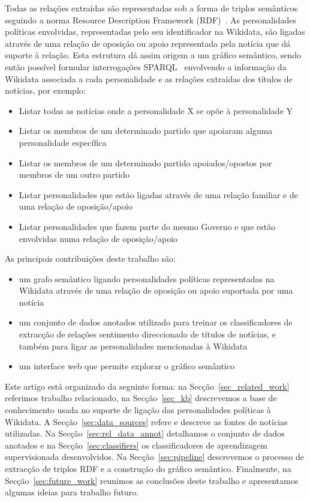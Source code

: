 \documentclass[a4paper, twocolumn, 11pt, twoside]{article}
\begin{document}
Todas as relações extraídas são representadas sob a forma de triplos semânticos seguindo a norma Resource Description Framework (RDF)~\citep{schreiber2014primer}. As personalidades políticas envolvidas, representadas pelo seu identificador na Wikidata, são ligadas através de uma relação de oposição ou apoio representada pela notícia que dá suporte à relação. Esta estrutura dá assim origem a um gráfico semântico, sendo então possível formular interrogações SPARQL~\citep{2013sparql} envolvendo a informação da Wikidata associada a cada personalidade e as relações extraídas dos títulos de notícias, por exemplo:

\begin{itemize}
\item{Listar todas as notícias onde a personalidade X se opõe à personalidade Y}
\item{Listar os membros de um determinado partido que apoiaram alguma personalidade específica}
\item{Listar os membros de um determinado partido apoiados/opostos por membros de um outro partido}
\item{Listar personalidades que estão ligadas através de uma relação familiar e de uma relação de oposição/apoio}
\item{Listar personalidades que fazem parte do mesmo Governo e que estão envolvidas numa relação de oposição/apoio}
\end{itemize}

As principais contribuições deste trabalho são: 

\begin{itemize}
\item{um grafo semântico ligando personalidades políticas representadas na Wikidata através de uma relação de oposição ou apoio suportada por uma notícia}
\item{um conjunto de dados anotados utilizado para treinar os classificadores de extracção de relações sentimento direccionado de títulos de notícias, e também para ligar as personalidades mencionadas à Wikidata}
\item{um interface web que permite explorar o gráfico semântico}
\end{itemize}

Este artigo está organizado da seguinte forma: na Secção~\ref{sec_related_work} referimos trabalho relacionado, na Secção~\ref{sec_kb} descrevemos a base de conhecimento usada no suporte de ligação das personalidades políticas à Wikidata. A Secção~\ref{sec:data_sources} refere e descreve as fontes de notícias utilizadas. Na Secção~\ref{sec:rel_data_annot} detalhamos o conjunto de dados anotados e na Secção~\ref{sec:classifiers} os classificadores de aprendizagem supervisionada desenvolvidos. Na Secção~\ref{sec:pipeline} descrevemos o processo de extracção de triplos RDF e a construção do gráfico semântico. Finalmente, na Secção~\ref{sec:future_work} reunimos as conclusões deste trabalho e apresentamos algumas ideias para trabalho futuro.
\end{document}
